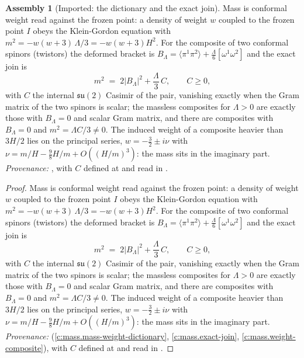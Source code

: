 \documentclass[11pt]{article}
\theoremstyle{definition}
\newtheorem{assembled}[theorem]{Assembly}
\theoremstyle{plain}
\newcommand{\changedmark}[2]{\marginpar{\raggedright\scriptsize\color{#1}#2}}
\providecommand{\br}{}\renewcommand{\br}[1]{\langle #1\rangle}
\begin{document}
\begin{assembled}[Imported: the dictionary and the exact join]\label{c:families.imported-dictionary-exact-join}
\changedmark{gray}{reworded}
Mass is conformal weight read against the frozen point: a density of weight $w$ coupled to the frozen point $I$ obeys the Klein-Gordon equation with $m^{2} = -w(w+3)\,\Lambda/3 = -w(w+3)H^{2}$. For the composite of two conformal spinors (twistors) the deformed bracket is $B_{\Lambda} = \br{\pi^{1}\pi^{2}} + \tfrac{\Lambda}{6}[\omega^{1}\omega^{2}]$ and the exact join is
\[
m^{2} \;=\; 2|B_{\Lambda}|^{2} + \frac{\Lambda}{3}\,C, \qquad C \ge 0,
\]
with $C$ the internal $\mathfrak{su}(2)$ Casimir of the pair, vanishing exactly when the Gram matrix of the two spinors is scalar; the massless composites for $\Lambda > 0$ are exactly those with $B_{\Lambda} = 0$ and scalar Gram matrix, and there are composites with $B_{\Lambda} = 0$ and $m^{2} = \Lambda C/3 \ne 0$. The induced weight of a composite heavier than $3H/2$ lies on the principal series, $w = -\tfrac32 \pm i\nu$ with $\nu = m/H - \tfrac98 H/m + O((H/m)^{3})$: the mass sits in the imaginary part. \emph{Provenance:} \cite[Thm.~3.1, Thm.~5.6, Prop.~5.9]{ButlerT11}, with $C$ defined at \cite[eq.~(9)]{ButlerT11} and read in \cite[Rem.~5.10]{ButlerT11}.
\end{assembled}
\begin{proof}
Mass is conformal weight read against the frozen point: a density of weight $w$ coupled to the frozen point $I$ obeys the Klein-Gordon equation with $m^{2} = -w(w+3)\,\Lambda/3 = -w(w+3)H^{2}$. For the composite of two conformal spinors (twistors) the deformed bracket is $B_{\Lambda} = \br{\pi^{1}\pi^{2}} + \tfrac{\Lambda}{6}[\omega^{1}\omega^{2}]$ and the exact join is
\[
m^{2} \;=\; 2|B_{\Lambda}|^{2} + \frac{\Lambda}{3}\,C, \qquad C \ge 0,
\]
with $C$ the internal $\mathfrak{su}(2)$ Casimir of the pair, vanishing exactly when the Gram matrix of the two spinors is scalar; the massless composites for $\Lambda > 0$ are exactly those with $B_{\Lambda} = 0$ and scalar Gram matrix, and there are composites with $B_{\Lambda} = 0$ and $m^{2} = \Lambda C/3 \ne 0$. The induced weight of a composite heavier than $3H/2$ lies on the principal series, $w = -\tfrac32 \pm i\nu$ with $\nu = m/H - \tfrac98 H/m + O((H/m)^{3})$: the mass sits in the imaginary part. \emph{Provenance:} \cite[Thm.~3.1, Thm.~5.6, Prop.~5.9]{ButlerT11} (\ref{c:mass.mass-weight-dictionary}, \ref{c:mass.exact-join}, \ref{c:mass.weight-composite}), with $C$ defined at \cite[eq.~(9)]{ButlerT11} and read in \cite[Rem.~5.10]{ButlerT11}.

\end{proof}
\end{document}
